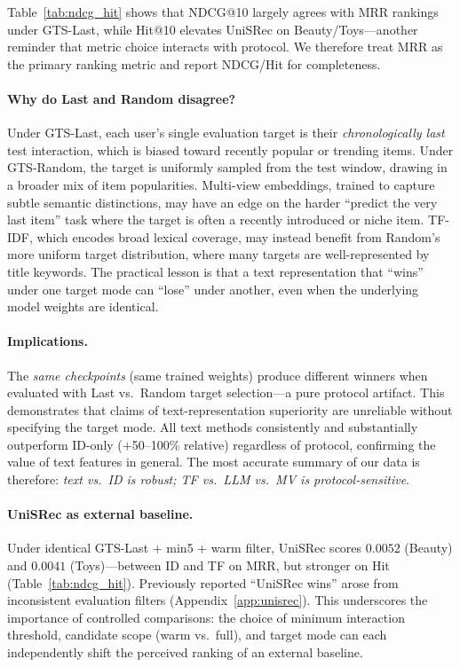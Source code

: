 \documentclass[sigconf,natbib=true,anonymous]{acmart}
\begin{document}
Table~\ref{tab:ndcg_hit} shows that NDCG@10 largely agrees with MRR rankings under GTS-Last, while Hit@10 elevates UniSRec on Beauty/Toys---another reminder that metric choice interacts with protocol.
We therefore treat MRR as the primary ranking metric and report NDCG/Hit for completeness.

\paragraph{Why do Last and Random disagree?}
Under GTS-Last, each user's single evaluation target is their \emph{chronologically last} test interaction, which is biased toward recently popular or trending items.
Under GTS-Random, the target is uniformly sampled from the test window, drawing in a broader mix of item popularities.
Multi-view embeddings, trained to capture subtle semantic distinctions, may have an edge on the harder ``predict the very last item'' task where the target is often a recently introduced or niche item.
TF-IDF, which encodes broad lexical coverage, may instead benefit from Random's more uniform target distribution, where many targets are well-represented by title keywords.
The practical lesson is that a text representation that ``wins'' under one target mode can ``lose'' under another, even when the underlying model weights are identical.

\paragraph{Implications.}
The \emph{same checkpoints} (same trained weights) produce different winners when evaluated with Last vs.\ Random target selection---a pure protocol artifact.
This demonstrates that claims of text-representation superiority are unreliable without specifying the target mode.
All text methods consistently and substantially outperform ID-only ($+$50--100\% relative) regardless of protocol, confirming the value of text features in general.
The most accurate summary of our data is therefore: \emph{text vs.\ ID is robust; TF vs.\ LLM vs.\ MV is protocol-sensitive}.

\paragraph{UniSRec as external baseline.}
Under identical GTS-Last + min5 + warm filter, UniSRec scores $0.0052$ (Beauty) and $0.0041$ (Toys)---between ID and TF on MRR, but stronger on Hit (Table~\ref{tab:ndcg_hit}).
Previously reported ``UniSRec wins'' arose from inconsistent evaluation filters (Appendix~\ref{app:unisrec}).
This underscores the importance of controlled comparisons: the choice of minimum interaction threshold, candidate scope (warm vs.\ full), and target mode can each independently shift the perceived ranking of an external baseline.
\end{document}
